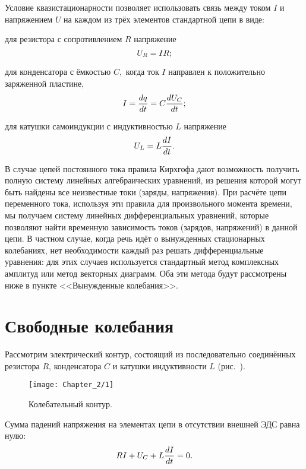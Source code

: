 Условие квазистационарности позволяет использовать связь между током $I$ и напряжением $U$ на каждом из трёх элементов стандартной цепи в виде: 

для резистора с сопротивлением $R$ напряжение
\begin{equation}
	\eqmark{2.1}
	U_R=IR;
\end{equation}

для конденсатора с ёмкостью $C,$ когда ток $I$ направлен к положительно заряженной пластине,
\begin{equation}
	\eqmark{2.2}
	I=\dfrac{dq}{dt}=C\dfrac{dU_C}{dt};
\end{equation}

для катушки самоиндукции с индуктивностью $L$ напряжение
\begin{equation}
	\eqmark{2.3}
	U_L=L\dfrac{dI}{dt}.
\end{equation}

В случае цепей постоянного тока правила Кирхгофа дают возможность получить полную систему линейных алгебраических уравнений, из решения которой могут быть найдены все неизвестные токи (заряды, напряжения). При расчёте цепи переменного тока, используя эти правила для произвольного момента времени, мы получаем систему линейных дифференциальных уравнений, которые позволяют найти временную зависимость токов (зарядов, напряжений) в данной цепи. В частном случае, когда речь идёт о вынужденных стационарных колебаниях, нет необходимости каждый раз решать дифференциальные уравнения: для этих случаев используется стандартный метод комплексных амплитуд или метод векторных диаграмм. Оба эти метода будут рассмотрены ниже в пункте <<Вынужденные колебания>>.

\section{Свободные колебания}

Рассмотрим электрический контур, состоящий из последовательно соединённых резистора $R$, конденсатора $C$ и катушки индуктивности $L$ (рис.~). 

\begin{figure}[h!]
	\centering\texttt{[image: Chapter\_2/1]}
	\caption{Колебательный контур.}
\end{figure}


Сумма падений напряжения на элементах цепи в отсутствии внешней ЭДС равна нулю:
\begin{equation}
	\eqmark{2.4}
	RI+U_C+L\dfrac{dI}{dt}=0.
\end{equation}

